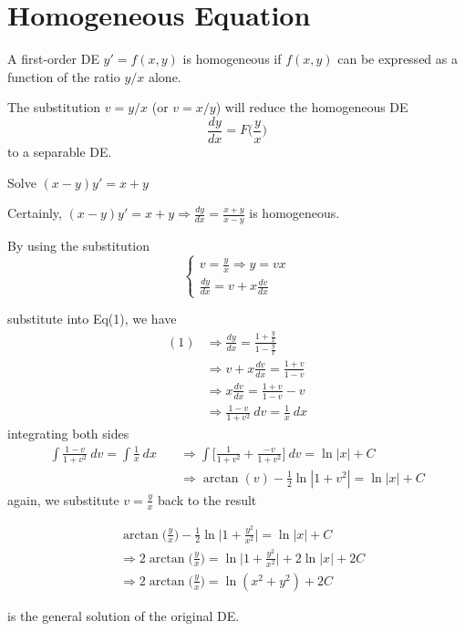 \section{Homogeneous Equation}

A first-order DE $y' = f(x,y)$ is homogeneous if $f(x,y)$ can be expressed as a function 
of the ratio $y/x$ alone.

\begin{theorem}
    The substitution $v = y/x$ (or $v = x/y$) will reduce the homogeneous DE 
    \begin{equation}
        \frac{dy}{dx} = F\biggl(\frac{y}{x}\biggr)
    \end{equation}
    to a separable DE.
\end{theorem}

\begin{example}
    Solve $(x - y)y' = x + y$
\end{example}
\begin{solution}
    Certainly, $(x - y)y' = x+y \Rightarrow \frac{dy}{dx} = \frac{x+y}{x-y}$ is homogeneous.

    By using the substitution
    \[
        \begin{cases}
            v = \frac{y}{x} \Rightarrow y = vx\\
            \frac{dy}{dx} = v + x \frac{dv}{dx}
        \end{cases}
    \]

    substitute into Eq(1), we have 
    \begin{align*}
        (1) &\Rightarrow \frac{dy}{dx} = \frac{1 + \frac{y}{x}}{1 - \frac{y}{x}}\\
        &\Rightarrow v + x\frac{dv}{dx} = \frac{1+v}{1-v}\\
        &\Rightarrow x \frac{dv}{dx} = \frac{1+v}{1-v} - v\\
        &\Rightarrow \frac{1-v}{1+v^2} \> dv = \frac{1}{x} \> dx
    \end{align*}
    integrating both sides
    \begin{align*}
        \int \frac{1-v}{1+v^2} \> dv = \int \frac{1}{x} \> dx \quad &\Rightarrow 
        \int \biggl[\frac{1}{1+v^2} + \frac{-v}{1+v^2}\biggr] \> dv = \ln |x| + C\\
        &\Rightarrow \arctan(v) - \frac{1}{2} \ln |1+v^2| = \ln|x| + C
    \end{align*}
    again, we substitute $v = \frac{y}{x}$ back to the result

    \begin{align*}
        & \arctan \biggl(\frac{y}{x}\biggr) - \frac{1}{2} \ln \bigg \vert 1+\frac{y^2}{x^2} \bigg \vert = \ln|x| + C\\
        &\Rightarrow 2 \arctan \biggl(\frac{y}{x}\biggr) = \ln \bigg \vert 1+\frac{y^2}{x^2} \bigg \vert + 2 \ln |x| + 2C\\
        &\Rightarrow 2 \arctan \biggl(\frac{y}{x}\biggr) = \ln (x^2 + y^2) + 2C
    \end{align*}

    is the general solution of the original DE.
\end{solution}

